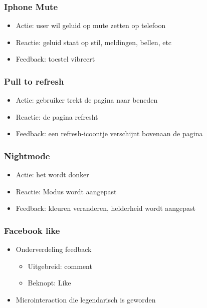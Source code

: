 \documentclass{article}
\begin{document}
\subsubsection{Iphone Mute}

\begin{itemize}
    \item Actie: user wil geluid op mute zetten op telefoon
    \item Reactie: geluid staat op stil, meldingen, bellen, etc
    \item Feedback: toestel vibreert
\end{itemize}

\subsubsection{Pull to refresh}

\begin{itemize}
    \item Actie: gebruiker trekt de pagina naar beneden
    \item Reactie: de pagina refresht
    \item Feedback: een refresh-icoontje verschijnt bovenaan de pagina
\end{itemize}

\subsubsection{Nightmode}

\begin{itemize}
    \item Actie: het wordt donker
    \item Reactie: Modus wordt aangepast
    \item Feedback: kleuren veranderen, helderheid wordt aangepast
\end{itemize}

\subsubsection{Facebook like}

\begin{itemize}
    \item Onderverdeling feedback
    \begin{itemize}
        \item Uitgebreid: comment
        \item Beknopt: Like
    \end{itemize}
    \item Microinteraction die legendarisch is geworden
\end{itemize}
\end{document}
